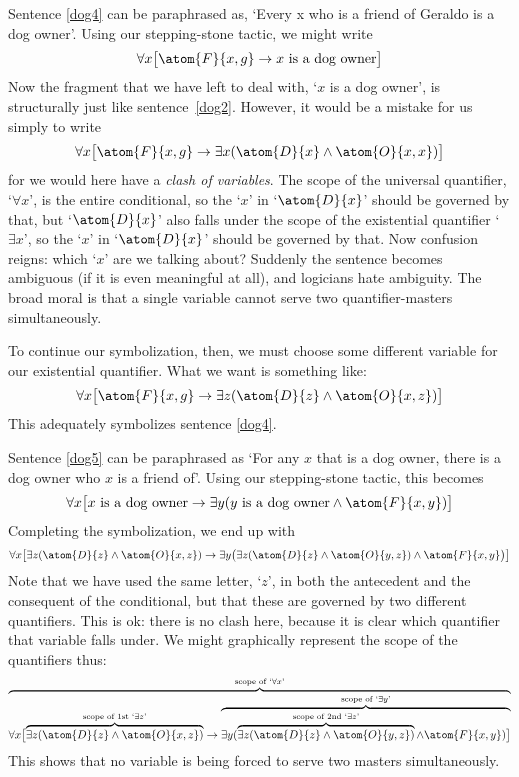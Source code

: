 Sentence \ref{dog4} can be paraphrased as, `Every x who is a friend of Geraldo is a dog owner'. Using our stepping-stone tactic, we might write 
$$\forall x \bigl[\atom{F}{x,g} \eif x \text{ is a dog owner}\bigr]$$
Now the fragment that we have left to deal with, `$x$ is a dog owner', is structurally just like sentence~\ref{dog2}. However, it would be a mistake for us simply to write 
$$\forall x \bigl[\atom{F}{x,g} \eif \exists x(\atom{D}{x} \eand \atom{O}{x,x})\bigr]$$
for we would here have a \emph{clash of variables}. The scope of the universal quantifier, `$\forall x$', is the entire conditional, so the `$x$' in `$\atom{D}{x}$' should be governed by that, but `$\atom{D}{x}$' also falls under the scope of the existential quantifier `$\exists x$', so the `$x$' in `$\atom{D}{x}$' should be governed by that. Now confusion reigns: which `$x$' are we talking about? Suddenly the sentence becomes ambiguous (if it is even meaningful at all), and logicians hate ambiguity. The broad moral is that a single variable cannot serve two quantifier-masters simultaneously.

To continue our symbolization, then, we must choose some different variable for our existential quantifier. What we want is something like:
$$\forall x\bigl[\atom{F}{x,g} \eif\exists z(\atom{D}{z} \eand \atom{O}{x,z})\bigr]$$
This adequately symbolizes sentence \ref{dog4}.

Sentence \ref{dog5} can be paraphrased as `For any $x$ that is a dog owner, there is a dog owner who $x$ is a friend of'. Using our stepping-stone tactic, this becomes 
$$\forall x\bigl[\mbox{$x$ is a dog owner}\eif\exists y(\mbox{$y$ is a dog owner}\eand \atom{F}{x,y})\bigr]$$
Completing the symbolization, we end up with
$$\forall x\bigl[\exists z(\atom{D}{z} \eand \atom{O}{x,z})\eif\exists y\bigl(\exists z(\atom{D}{z} \eand \atom{O}{y,z})\eand \atom{F}{x,y}\bigr)\bigr]$$
Note that we have used the same letter, `$z$', in both the antecedent and the consequent of the conditional, but that these are governed by two different quantifiers. This is ok: there is no clash here, because it is clear which quantifier that variable falls under. We might graphically represent the scope of the quantifiers thus:
$$\overbrace{\forall x\bigl[\overbrace{\exists z(\atom{D}{z} \eand \atom{O}{x,z})}^{\text{scope of 1st `}\exists z\text{'}}\eif \overbrace{\exists y(\overbrace{\exists z(\atom{D}{z} \eand \atom{O}{y,z})}^{\text{scope of 2nd `}\exists z\text{'}}\eand \atom{F}{x,y})\bigr]}^{\text{scope of `}\exists y\text{'}}}^{\text{scope of `}\forall x\text{'}}$$
This shows that no variable is being forced to serve two masters simultaneously.

